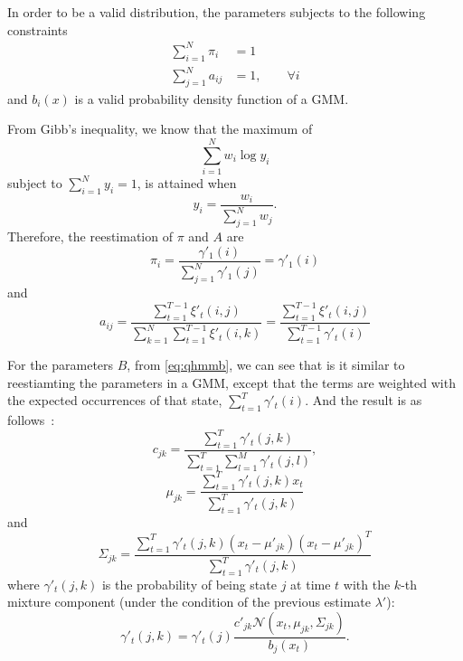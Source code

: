 \documentclass[12pt,final,twoside]{report}
\begin{document}
In order to be a valid distribution, the parameters subjects to the following constraints
\begin{align}
  \sum_{i=1}^{N} \pi_i &= 1  \\
  \sum_{j=1}^{N} a_{ij} &= 1 , \qquad \forall i 
\end{align}
and $b_i(x)$ is a valid probability density function of a GMM.

From Gibb's inequality, we know that the maximum of 
\begin{equation}
  \sum_{i=1}^N w_i \log y_i
\end{equation}
subject to $\sum_{i=1}^N y_i = 1$, is attained when
\begin{equation}
  y_i = \frac{w_i}{\sum_{j=1}^N w_j} .
\end{equation} 
Therefore, the reestimation of $\pi$ and $A$ are
\begin{equation}
  \pi_i = \frac{\gamma'_1(i)}{\sum_{j=1}^N \gamma'_1(j)} = \gamma'_1(i)
  \label{eq:hmmpi}
\end{equation} 
and
\begin{equation}
  a_{ij} = \frac{\sum_{t=1}^{T-1} \xi'_t(i,j)}{\sum_{k=1}^N \sum_{t=1}^{T-1} \xi'_t(i,k)} = \frac{\sum_{t=1}^{T-1} \xi'_t(i,j)}{\sum_{t=1}^{T-1} \gamma'_t(i)}
  \label{eq:hmma}
\end{equation} 

For the parameters $B$, from \cref{eq:qhmmb}, we can see that is it similar to reestiamting the parameters in a GMM, except that the terms are weighted with the expected occurrences of that state, $\sum_{t=1}^{T} \gamma'_t(i)$. And the result is as follows~\cite{bilmes_gentle_1998}:
\begin{equation}
  c_{jk} = \frac{\sum_{t=1}^{T} \gamma'_t(j,k)}{\sum_{t=1}^{T} \sum_{l=1}^{M} \gamma'_t(j,l)},
  \label{eq:hmmc}
\end{equation}
\begin{equation}
  \mu_{jk} = \frac{\sum_{t=1}^{T} \gamma'_t(j,k) x_t}{\sum_{t=1}^{T} \gamma'_t(j,k)}
  \label{eq:hmmmu}
\end{equation}
and
\begin{equation}
  \Sigma_{jk} = \frac{\sum_{t=1}^{T} \gamma'_t(j,k) (x_t-\mu'_{jk})(x_t-\mu'_{jk})^T}{\sum_{t=1}^{T} \gamma'_t(j,k)}
  \label{eq:hmmsigma}
\end{equation}
where $\gamma'_t(j,k)$ is the probability of being state $j$ at time $t$ with the $k$-th mixture component (under the condition of the previous estimate $\lambda'$):
\begin{equation}
  \gamma'_t(j,k) = \gamma'_t(j) \frac{c'_{jk} \mathcal{N}(x_t,\mu_{jk},\Sigma_{jk})} {b_j(x_t)} . \label{eq:hmmgamma2}
\end{equation}
\end{document}
